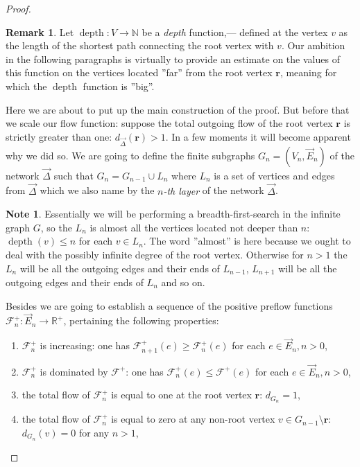 \documentclass[12pt]{article}
\renewcommand{\leq}{\leqslant}
\renewcommand{\geq}{\geqslant}
\theoremstyle{definition}
\newtheorem{remark}{Remark}
\newtheorem*{note}{Note}
\newcommand{\depth}{\operatorname{depth}}
\newcommand{\flowpos}{\mathcal{F}^{+}}
\newcommand{\flowposn}[1]{\mathcal{F}_{#1}^{+}}
\renewcommand{\root}{\mathbf{r}}
\newcommand{\onet}{\vec{\Delta}}
\numberwithin{remark}{section}
\numberwithin{theorem}{section}
\numberwithin{prop}{section}
\numberwithin{equation}{section}
\numberwithin{lemma}{section}
\numberwithin{prop_under_lemma}{lemma}
\begin{document}
\begin{proof}
\begin{remark}
        Let $\depth: V \to \mathbb{N}$ be a \emph{depth} function,--- defined at the vertex $v$ as the length of the shortest path connecting the root vertex with
          $v$.
        Our ambition in the following paragraphs is virtually to provide an estimate on the values of this function on the vertices
          located ''far'' from the root vertex $\root$, meaning for which the $\depth$ function is ''big''. 
      \end{remark}
      Here we are about to put up the main construction of the proof.
      But before that we scale our flow function: suppose the total outgoing flow of the root vertex $\root$ is strictly greater than one:
        $d_{\onet}(\root) > 1$.
      In a few moments it will become apparent why we did so.
      We are going to define the finite subgraphs $G_n = (V_n, \vec{E}_n)$ of the network $\onet$ such that
        $G_{n} = G_{n-1} \cup L_n$ where $L_n$ is a set of vertices and edges from $\onet$ which we also name by
        the \emph{$n$-th layer} of the network $\onet$.
      \begin{note}
        Essentially we will be performing a breadth-first-search in the infinite graph $G$, so the $L_n$ is
          almost all the vertices located not deeper than $n$: $\depth(v) \leq n$ for each $v \in L_n$.
        The word ''almost'' is here because we ought to deal with the possibly infinite degree of the root vertex.
        Otherwise for $n > 1$ the $L_n$ will be all the outgoing edges and their ends of $L_{n-1}$, $L_{n+1}$ will be
          all the outgoing edges and their ends of $L_n$ and so on.
      \end{note}
      Besides we are going to establish a sequence of the positive preflow functions $\flowposn{n}: \vec{E}_n \to \mathbb{R}^{+}$,
        pertaining the following properties:
        \begin{enumerate}[label=\textbf{P\arabic*}]
          \item \label{p1} $\flowposn{n}$ is increasing: one has $\flowposn{n+1}(e) \geq \flowposn{n}(e)$ for each $e \in \vec{E}_n, n > 0$,
          \item \label{p2} $\flowposn{n}$ is dominated by $\flowpos$: one has $\flowposn{n}(e) \leq \flowpos(e)$ for each $e \in \vec{E}_n, n> 0$,
          \item \label{p3} the total flow of $\flowposn{n}$ is equal to one at the root vertex $\root$: $d_{G_n} = 1$,
          \item \label{p4} the total flow of $\flowposn{n}$ is equal to zero at any non-root vertex $v \in G_{n-1}\setminus \root$: $d_{G_n}(v) = 0$ for any $n > 1$,

\end{enumerate}
\end{proof}
\end{document}
